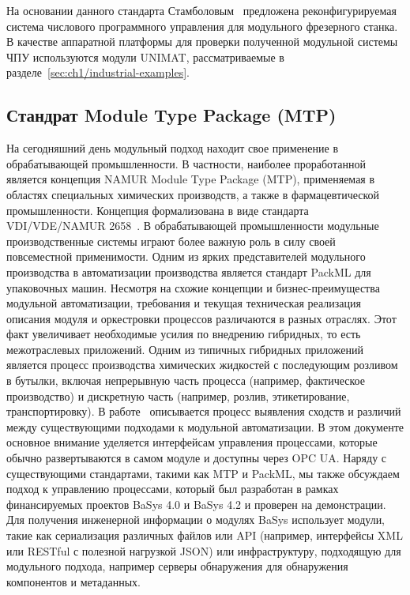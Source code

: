 На основании данного стандарта Стамболовым~\cite{stambolov2013development} предложена реконфигурируемая система числового программного управления для модульного фрезерного станка. В качестве аппаратной платформы для проверки полученной модульной системы ЧПУ используются модули UNIMAT, рассматриваемые в разделе~\cref{sec:ch1/industrial-examples}. 

\subsection{Стандрат Module Type Package (MTP)}

На сегодняшний день модульный подход находит свое применение в обрабатывающей промышленности. В частности, наиболее проработанной является концепция NAMUR Module Type Package (MTP), применяемая в областях специальных химических производств, а также в фармацевтической промышленности. Концепция формализована в виде стандарта VDI/VDE/NAMUR 2658~\cite{bernshausen2016namur}. В обрабатывающей промышленности модульные производственные системы играют более важную роль в силу своей повсеместной применимости. Одним из ярких представителей модульного производства в автоматизации производства является стандарт PackML для упаковочных машин. Несмотря на схожие концепции и бизнес-преимущества модульной автоматизации, требования и текущая техническая реализация описания модуля и оркестровки процессов различаются в разных отраслях. Этот факт увеличивает необходимые усилия по внедрению гибридных, то есть межотраслевых приложений. Одним из типичных гибридных приложений является процесс производства химических жидкостей с последующим розливом в бутылки, включая непрерывную часть процесса (например, фактическое производство) и дискретную часть (например, розлив, этикетирование, транспортировку). В работе~\cite{grothoff2020mapping} описывается процесс выявления сходств и различий между существующими подходами к модульной автоматизации. В этом документе основное внимание уделяется интерфейсам управления процессами, которые обычно развертываются в самом модуле и доступны через OPC UA. Наряду с существующими стандартами, такими как MTP и PackML, мы также обсуждаем подход к управлению процессами, который был разработан в рамках финансируемых проектов BaSys 4.0 и BaSys 4.2 и проверен на демонстрации. Для получения инженерной информации о модулях BaSys использует модули, такие как сериализация различных файлов или API (например, интерфейсы XML или RESTful с полезной нагрузкой JSON) или инфраструктуру, подходящую для модульного подхода, например серверы обнаружения для обнаружения компонентов и метаданных.

